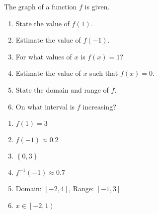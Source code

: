 \begin{exercise}
	The graph of a function $f$ is given.
	\renewcommand{\labelenumi}{(\alph{enumi})}
	\begin{enumerate}
		\item State the value of $f\left(1\right)$.
		\item Estimate the value of $f\left(-1\right)$.
		\item For what values of $x$ is $f\left(x\right)=1$?
		\item Estimate the value of $x$ such that $f\left(x\right)=0$.
		\item State the domain and range of $f$.
		\item On what interval is $f$ increasing?
	\end{enumerate}
\end{exercise}
\begin{solution}
	{\color{white}{content...}}
	\renewcommand{\labelenumi}{(\alph{enumi})}
	\begin{enumerate}
		\item $f\left(1\right)=3$
		\item $f\left(-1\right)\approx 0.2$
		\item $\left\lbrace 0, 3 \right\rbrace$
		\item $f^{-1}\left(-1\right)\approx 0.7$
		\item Domain: $\left[ -2, 4 \right]$, Range: $\left[ -1, 3 \right]$
		\item $x \in \left[ -2, 1 \right)$
	\end{enumerate}
\end{solution}
